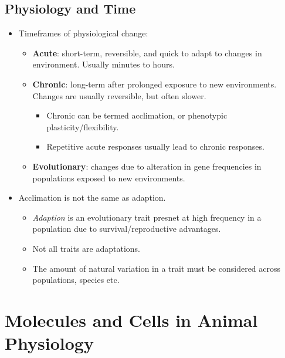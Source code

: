 \documentclass[12pt,a4paper]{article}
\begin{document}
\subsection{Physiology and Time}
\begin{itemize}
    \item Timeframes of physiological change:
        \begin{itemize}
            \item \textbf{Acute}: short-term, reversible, and quick to adapt to changes in environment. Usually minutes to hours.
            \item \textbf{Chronic}: long-term after prolonged exposure to new environments. Changes are usually reversible, but often slower. 
                \begin{itemize}
                    \item Chronic can be termed acclimation, or phenotypic plasticity/flexibility.
                     \item Repetitive acute responses usually lead to chronic responses.
                \end{itemize}
            \item \textbf{Evolutionary}: changes due to alteration in gene frequencies in {\color{o-Sun}populations} exposed to new environments.
        \end{itemize}
    \item Acclimation is {\color{false}not the same} as adaption.
        \begin{itemize}
            \item \textit{Adaption} is an evolutionary trait presnet at high frequency in a population due to survival/reproductive advantages. 
            \item Not all traits are adaptations.
            \item The amount of natural variation in a trait must be considered across populations, species etc.
        \end{itemize}
\end{itemize}

\clearpage
\section{Molecules and Cells in Animal Physiology}
\end{document}
